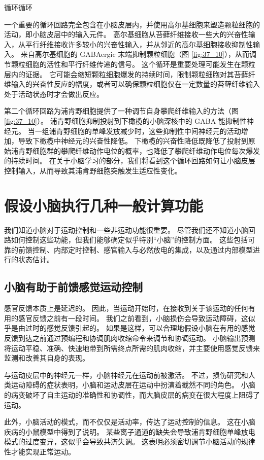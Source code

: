 循环循环

一个重要的循环回路完全包含在小脑皮层内，并使用高尔基细胞来塑造颗粒细胞的活动，即小脑皮层中的输入元件。
高尔基细胞从苔藓纤维接收一些大的兴奋性输入，从平行纤维接收许多较小的兴奋性输入，并从邻近的高尔基细胞接收抑制性输入。
来自高尔基细胞的 GABAergic 末端抑制颗粒细胞（图 \ref{fig:37_10}），从而调节颗粒细胞的活性和平行纤维传递的信号。
这个循环是重要处理可能发生在颗粒层内的证据。
它可能会缩短颗粒细胞爆发的持续时间，限制颗粒细胞对其苔藓纤维输入的兴奋性反应的幅度，或者可以确保颗粒细胞仅在一定数量的苔藓纤维输入处于活动状态时才会做出反应。


第二个循环回路为浦肯野细胞提供了一种调节自身攀爬纤维输入的方法（图 \ref{fig:37_10}）。
浦肯野细胞抑制投射到下橄榄的小脑深核中的 GABA 能抑制性神经元。
当一组浦肯野细胞的单峰发放减少时，这些抑制性中间神经元的活动增加，导致下橄榄中神经元的兴奋性降低。
下橄榄的兴奋性降低既降低了投射到原始浦肯野细胞群的攀爬纤维动作电位的概率，也降低了攀爬纤维动作电位每次爆发的持续时间。
在关于小脑学习的部分，我们将看到这个循环回路如何让小脑皮层控制输入，从而导致其浦肯野细胞突触发生适应性变化。


\section{假设小脑执行几种一般计算功能}

我们知道小脑对于运动控制和一些非运动功能很重要。
尽管我们还不知道小脑回路如何控制这些功能，但我们能够确定似乎特别“小脑”的控制方面。
这些包括可靠的前馈控制、内部定时控制、感官输入与必然放电的集成，以及通过内部模型进行的状态估计。


\subsection{小脑有助于前馈感觉运动控制}

感官反馈本质上是延迟的。
因此，当运动开始时，在接收到关于该运动的任何有用的感官反馈之前有一段时间。
我们之前看到，小脑损伤会导致运动障碍，这似乎是由过时的感觉反馈引起的。
如果是这样，可以合理地假设小脑在有用的感觉反馈到达之前通过预编程和协调肌肉收缩命令来调节和协调运动。
小脑输出预测将运动平稳、准确、快速地带到所需终点所需的肌肉收缩，并主要使用感觉反馈来监测和改善其自身的表现。


与运动皮层中的神经元一样，小脑神经元在运动前被激活。
不过，损伤研究和人类运动障碍的症状表明，小脑和运动皮层在运动中扮演着截然不同的角色。
小脑的病变破坏了自主运动的准确性和协调性，而大脑皮层的病变在很大程度上阻碍了运动。


此外，小脑活动的模式，而不仅仅是活动率，传达了运动控制的信息。
这在小脑疾病的小鼠模型中得到了说明。
某些离子通道的缺失会导致浦肯野细胞单峰放电模式的过度变异，这似乎会导致共济失调。
这表明必须密切调节小脑活动的规律性才能实现正常运动。


